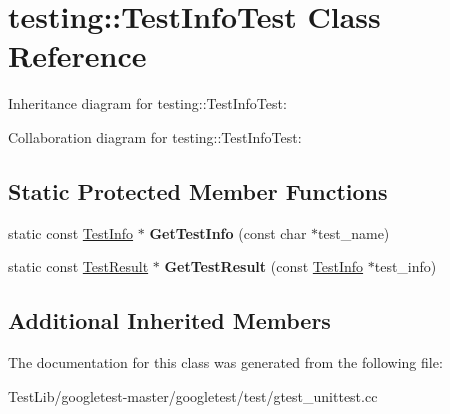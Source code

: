 \hypertarget{classtesting_1_1TestInfoTest}{}\section{testing\+:\+:Test\+Info\+Test Class Reference}
\label{classtesting_1_1TestInfoTest}


Inheritance diagram for testing\+:\+:Test\+Info\+Test\+:


Collaboration diagram for testing\+:\+:Test\+Info\+Test\+:
\subsection*{Static Protected Member Functions}
\begin{DoxyCompactItemize}
\item 
\mbox{\label{classtesting_1_1TestInfoTest_a4140c1302bf53c7f1375a23923624f04}} 
static const \hyperlink{classtesting_1_1TestInfo}{Test\+Info} $\ast$ {\bfseries Get\+Test\+Info} (const char $\ast$test\+\_\+name)
\item 
\mbox{\label{classtesting_1_1TestInfoTest_a154b3679b1aa00ad037ce46eb60d18c3}} 
static const \hyperlink{classtesting_1_1TestResult}{Test\+Result} $\ast$ {\bfseries Get\+Test\+Result} (const \hyperlink{classtesting_1_1TestInfo}{Test\+Info} $\ast$test\+\_\+info)
\end{DoxyCompactItemize}
\subsection*{Additional Inherited Members}


The documentation for this class was generated from the following file\+:\begin{DoxyCompactItemize}
\item 
Test\+Lib/googletest-\/master/googletest/test/gtest\+\_\+unittest.\+cc\end{DoxyCompactItemize}
